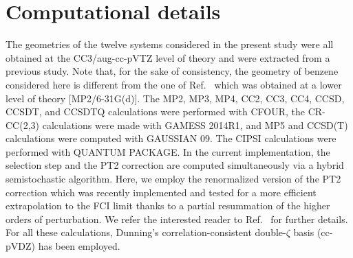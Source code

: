 \documentclass[aip,jcp,reprint,noshowkeys,superscriptaddress,floatfix]{revtex4-1}
\begin{document}
\section{Computational details}
\label{sec:compdet}
The geometries of the twelve systems considered in the present study were all obtained at the CC3/aug-cc-pVTZ level of theory and were extracted from a previous study. \cite{Loos_2020b}
Note that, for the sake of consistency, the geometry of benzene considered here is different from the one of Ref.~ which was obtained at a lower level of theory [MP2/6-31G(d)]. \cite{Schreiber_2008}
The MP2, MP3, MP4, CC2, CC3, CC4, CCSD, CCSDT, and CCSDTQ calculations were performed with CFOUR, \cite{Matthews_2020} the CR-CC(2,3) calculations were made with GAMESS 2014R1, \cite{gamess} and MP5 and CCSD(T) calculations were computed with GAUSSIAN 09. \cite{g09} 
The CIPSI calculations were performed with QUANTUM PACKAGE. \cite{Garniron_2019}
In the current implementation, the selection step and the PT2 correction are computed simultaneously via a hybrid semistochastic algorithm.\cite{Garniron_2017,Garniron_2019} 
Here, we employ the renormalized version of the PT2 correction which was recently implemented and tested for a more efficient extrapolation to the FCI limit thanks to a partial resummation of the higher orders of perturbation. \cite{Garniron_2019}
We refer the interested reader to Ref.~ for further details.
For all these calculations, Dunning's correlation-consistent double-$\zeta$ basis (cc-pVDZ) has been employed.
\end{document}
